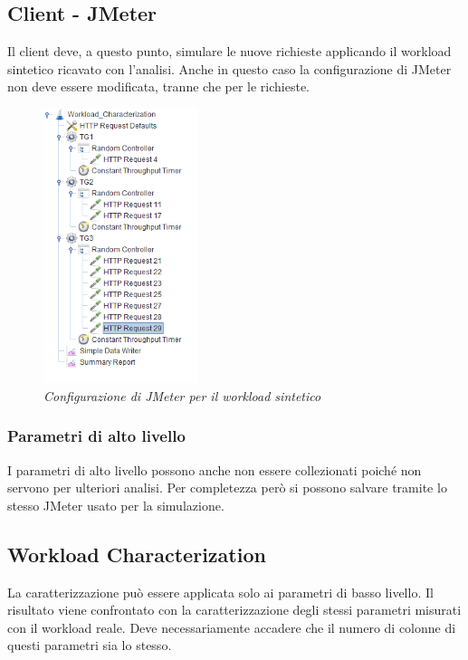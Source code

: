 \subsection{Client - JMeter}
Il client deve, a questo punto, simulare le nuove richieste applicando il workload sintetico ricavato con l'analisi. Anche in questo caso la configurazione di JMeter non deve essere modificata, tranne che per le richieste.
\begin{figure}[H]
	\centering
	\includegraphics[width=0.4\textwidth]{img/hw3/jmeter_sintetico.png}
	\caption{\textit{Configurazione di JMeter per il workload sintetico}}
\end{figure}

\subsubsection{Parametri di alto livello}
I parametri di alto livello possono anche non essere collezionati poiché non servono per ulteriori analisi. Per completezza però si possono salvare tramite lo stesso JMeter usato per la simulazione.


\subsection{Workload Characterization}
La caratterizzazione può essere applicata solo ai parametri di basso livello. Il risultato viene confrontato con la caratterizzazione degli stessi parametri misurati con il workload reale. Deve necessariamente accadere che il numero di colonne di questi parametri sia lo stesso.
